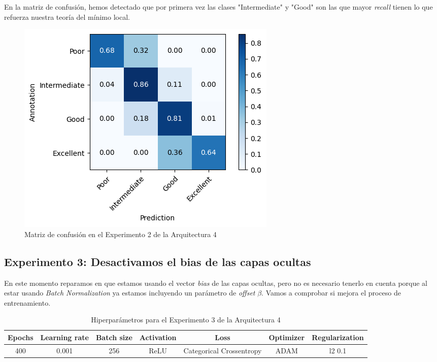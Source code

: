 \documentclass{article}
\begin{document}
			En la matriz de confusi\'on, hemos detectado que por primera vez las clases "Intermediate" y "Good" son las que mayor \textit{recall} tienen lo que refuerza nuestra teor\'ia del m\'inimo local.
			\begin{figure}[!h]
				\begin{center}
					\includegraphics[scale=0.7]{d-cm-a4-e2.png}		
					\caption{Matriz de confusi\'on en el Experimento 2 de la Arquitectura 4}	
					\label{d-cm-a4-e2}
				\end{center}
			\end{figure}
			
		\subsection{Experimento 3: Desactivamos el bias de las capas ocultas}
		\label{d-s-a4-e3}
			En este momento reparamos en que estamos usando el vector \textit{bias} de las capas ocultas, pero no es necesario tenerlo en cuenta porque al estar usando \textit{Batch Normalization} ya estamos incluyendo un par\'ametro de \textit{offset} $\beta$. Vamos a comprobar si mejora el proceso de entrenamiento.
			
			\begin{table}[!h]
				\begin{tabular}{| c | c | c | c | c | c | c |}
					\textbf{Epochs} & \textbf{Learning rate} & \textbf{Batch size} & \textbf{Activation} & \textbf{Loss} & \textbf{Optimizer} & \textbf{Regularization} \\ \hline
					400 & 0.001 & 256 & ReLU & Categorical Crossentropy & ADAM & l2 0.1
				\end{tabular}
				\caption{Hiperpar\'ametros para el Experimento 3 de la Arquitectura 4}
				\label{tab:hip-d-a4-e3}
			\end{table}
			
\end{document}
